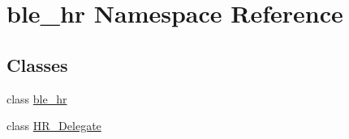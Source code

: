 \hypertarget{namespaceble__hr}{}\section{ble\+\_\+hr Namespace Reference}
\label{namespaceble__hr}
\subsection*{Classes}
\begin{DoxyCompactItemize}
\item 
class \hyperlink{classble__hr_1_1ble__hr}{ble\+\_\+hr}
\item 
class \hyperlink{classble__hr_1_1HR__Delegate}{H\+R\+\_\+\+Delegate}
\end{DoxyCompactItemize}
